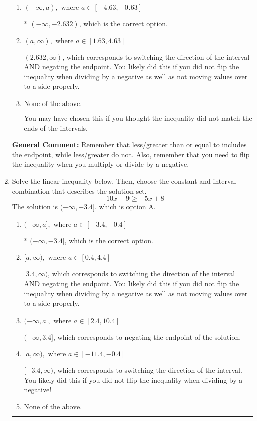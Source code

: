 \documentclass{extbook}[14pt]
\newcommand{\litem}[1]{\item #1

\rule{\textwidth}{0.4pt}}
\begin{document}
\begin{enumerate}
{\begin{enumerate}[label=\Alph*.]
 $(-\infty, 2.632)$, which corresponds to negating the endpoint of the solution.
\item \( (-\infty, a), \text{ where } a \in [-4.63, -0.63] \)

* $(-\infty, -2.632)$, which is the correct option.
\item \( (a, \infty), \text{ where } a \in [1.63, 4.63] \)

 $(2.632, \infty)$, which corresponds to switching the direction of the interval AND negating the endpoint. You likely did this if you did not flip the inequality when dividing by a negative as well as not moving values over to a side properly.
\item \( \text{None of the above}. \)

You may have chosen this if you thought the inequality did not match the ends of the intervals.
\end{enumerate}

\textbf{General Comment:} Remember that less/greater than or equal to includes the endpoint, while less/greater do not. Also, remember that you need to flip the inequality when you multiply or divide by a negative.
}
\litem{
Solve the linear inequality below. Then, choose the constant and interval combination that describes the solution set.
\[ -10x -9 \geq -5x + 8 \]
The solution is \( (-\infty, -3.4] \), which is option A.\begin{enumerate}[label=\Alph*.]
\item \( (-\infty, a], \text{ where } a \in [-3.4, -0.4] \)

* $(-\infty, -3.4]$, which is the correct option.
\item \( [a, \infty), \text{ where } a \in [0.4, 4.4] \)

 $[3.4, \infty)$, which corresponds to switching the direction of the interval AND negating the endpoint. You likely did this if you did not flip the inequality when dividing by a negative as well as not moving values over to a side properly.
\item \( (-\infty, a], \text{ where } a \in [2.4, 10.4] \)

 $(-\infty, 3.4]$, which corresponds to negating the endpoint of the solution.
\item \( [a, \infty), \text{ where } a \in [-11.4, -0.4] \)

 $[-3.4, \infty)$, which corresponds to switching the direction of the interval. You likely did this if you did not flip the inequality when dividing by a negative!
\item \( \text{None of the above}. \)


\end{enumerate}}
\end{enumerate}
\end{document}
